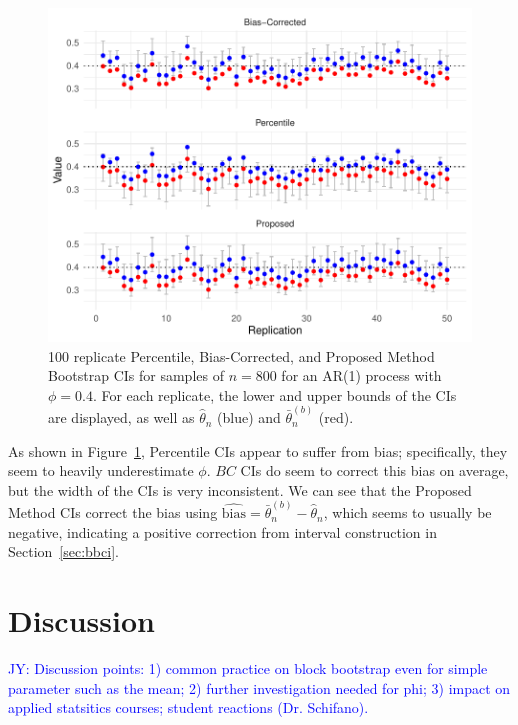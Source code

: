 \documentclass[12pt, letterpaper, titlepage]{article}
\newcommand{\jy}[1]{\textcolor{blue}{JY: #1}}
\begin{document}
\begin{figure}[tbp]
  \centering
  \includegraphics[width=\textwidth]{figures/norm_phi_intervals}
  \caption{100 replicate Percentile, Bias-Corrected, and Proposed Method Bootstrap CIs for samples of $n = 800$ for
    an AR(1) process with $\phi = 0.4$. For each replicate, the lower and upper bounds
    of the CIs are displayed, as well as $\hat\theta_n$ (blue) and $\bar\theta_n^{(b)}$ (red). }
  \label{fig:npi}
\end{figure}

As shown in Figure~\ref{fig:npi}, Percentile CIs appear to suffer from bias;
specifically, they seem to heavily underestimate $\phi$. $BC$ CIs do seem to correct this bias on average, but the width of
  the 
CIs is very inconsistent. We can see that the 
Proposed Method CIs correct the bias using 
$\widehat{\text{bias}} = \bar\theta_n^{(b)} -
  \hat\theta_n$, which seems to usually be negative, indicating a positive 
	correction from interval construction in Section~\ref{sec:bbci}.

\section{Discussion}
\label{sec:disc}

\jy{Discussion points:
  1) common practice on block bootstrap even for simple parameter such as the
  mean;
  2) further investigation needed for phi;
  3) impact on applied statsitics courses; student reactions (Dr. Schifano).
}
\end{document}
